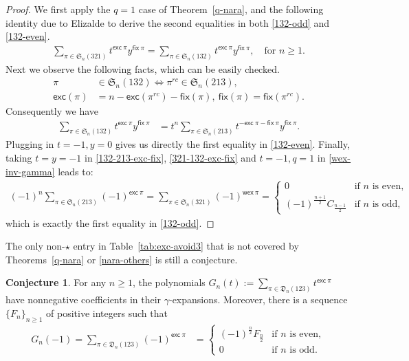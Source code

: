 \documentclass[12pt,reqno]{amsart}
\numberwithin{equation}{section}
\theoremstyle{plain}
\theoremstyle{definition}
\newtheorem{conj}[theorem]{Conjecture}
\def\S{\mathfrak{S}}
\def\D{\mathfrak{D}}
\def\exc{\mathsf{exc}}
\def\fix{\mathsf{fix}}
\def\wex{\mathsf{wex}}
\begin{document}
\begin{proof}
We first apply the $q=1$ case of Theorem~\ref{q-nara}, and the following identity due to Elizalde \cite{Eli} to derive the second equalities in both \eqref{132-odd} and \eqref{132-even}.
\begin{align}\label{321-132-exc-fix}
\sum_{\pi\in\S_n(321)}t^{\exc\:\pi}y^{\fix\:\pi}=\sum_{\pi\in\S_n(132)}t^{\exc\:\pi}y^{\fix\:\pi}, \quad \text{for $n\ge 1$}.
\end{align}
Next we observe the following facts, which can be easily checked.
\begin{align*}
\pi &\in\S_n(132) \Leftrightarrow \pi^{rc}\in\S_n(213),\\
\exc(\pi) &= n-\exc(\pi^{rc})-\fix(\pi),\: \fix(\pi)=\fix(\pi^{rc}).
\end{align*}
Consequently we have
\begin{align}\label{132-213-exc-fix}
\sum_{\pi\in\S_n(132)}t^{\exc\:\pi}y^{\fix\:\pi} &= t^n\sum_{\pi\in\S_n(213)}t^{-\exc\:\pi-\fix\:\pi}y^{\fix\:\pi}.
\end{align}
Plugging in $t=-1,y=0$ gives us directly the first equality in \eqref{132-even}. Finally, taking $t=y=-1$ in \eqref{132-213-exc-fix}, \eqref{321-132-exc-fix} and $t=-1,q=1$ in \eqref{wex-inv-gamma} leads to:
\begin{align*}
(-1)^n\sum_{\pi\in\S_n(213)}(-1)^{\exc\:\pi}=\sum_{\pi\in\S_n(321)}(-1)^{\wex\:\pi}=\begin{cases}0 & \textrm{if $n$ is even},\\
(-1)^{\frac{n+1}{2}}C_{\frac{n-1}{2}} & \textrm{if $n$ is odd},
\end{cases}
\end{align*}
which is exactly the first equality in \eqref{132-odd}.
\end{proof}




The only non-$\star$ entry in Table~\ref{tab:exc-avoid3} that is not covered by Theorems~\ref{q-nara} or \ref{nara-others} is still a conjecture.

\begin{conj}\label{conj}
For any $n\geq 1$, the polynomials $G_n(t):=\sum\limits_{\pi\in\D_n(123)}t^{\exc\:\pi}$ have nonnegative coefficients in their $\gamma$-expansions. Moreover, there is a sequence $\{F_n\}_{n\ge 1}$ of positive integers such that
\begin{align*}
G_{n}(-1)=\sum_{\pi\in\D_n(123)}(-1)^{\exc\:\pi}&=\begin{cases}(-1)^{\frac{n}{2}}F_{\frac{n}{2}} & \textrm{if $n$ is even},\\
0 & \textrm{if $n$ is odd}.
\end{cases}
\end{align*}
\end{conj}
\end{document}

